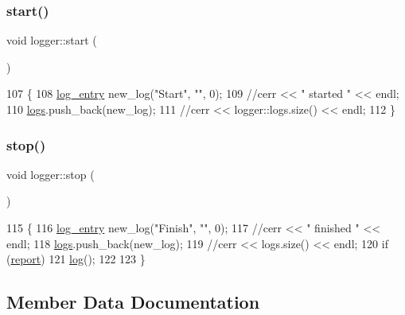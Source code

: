 \mbox{\label{classlogger_afba86118a3bb044060be8309b3fa755a}} 
\subsubsection{\texorpdfstring{start()}{start()}}
{\footnotesize\ttfamily void logger\+::start (\begin{DoxyParamCaption}{ }\end{DoxyParamCaption})\hspace{0.3cm}{\ttfamily [static]}}


\begin{DoxyCode}
107                   \{
108   \hyperlink{classlog__entry}{log\_entry} new\_log(\textcolor{stringliteral}{"Start"}, \textcolor{stringliteral}{""}, 0);
109   \textcolor{comment}{//cerr << " started " << endl;}
110   \hyperlink{classlogger_a46e89697a97bc41a90ec78763bfe4d39}{logs}.push\_back(new\_log);
111   \textcolor{comment}{//cerr << logger::logs.size() << endl;}
112 \}
\end{DoxyCode}
\mbox{\label{classlogger_abb856642f4e62c7a4a11cc4a2d963010}} 
\subsubsection{\texorpdfstring{stop()}{stop()}}
{\footnotesize\ttfamily void logger\+::stop (\begin{DoxyParamCaption}{ }\end{DoxyParamCaption})\hspace{0.3cm}{\ttfamily [static]}}


\begin{DoxyCode}
115                  \{
116   \hyperlink{classlog__entry}{log\_entry} new\_log(\textcolor{stringliteral}{"Finish"}, \textcolor{stringliteral}{""}, 0);
117   \textcolor{comment}{//cerr << " finished " << endl;}
118   \hyperlink{classlogger_a46e89697a97bc41a90ec78763bfe4d39}{logs}.push\_back(new\_log);
119   \textcolor{comment}{//cerr << logs.size() << endl;}
120   \textcolor{keywordflow}{if} (\hyperlink{classlogger_adbcc380b0ef53e23125f91e1c8f13f4e}{report})
121     \hyperlink{classlogger_ab518e6d927694bb7329e933fa75c27bf}{log}();
122 
123 \}
\end{DoxyCode}


\subsection{Member Data Documentation}
\mbox{\label{classlogger_a9d29b49bd318a719a8e85b59eac54fe0}} 
